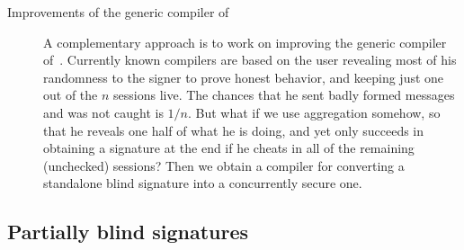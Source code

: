 \begin{description}
\item[Improvements of the generic compiler of~\cite{}]  A complementary approach is to work on improving the generic compiler of~\cite{}.  
Currently known compilers are based on the user revealing most of his randomness to the signer to prove honest behavior, and keeping just one out of the $n$ sessions live.  The chances that he sent badly formed messages and was not caught is $1/n$.  But what if we use aggregation somehow, so that he reveals one half of what he is doing, and yet only succeeds in obtaining a signature at the end if he cheats in all of the remaining (unchecked) sessions? Then we obtain a compiler for converting a standalone blind signature into a concurrently secure one.  
\end{description}


\subsection{Partially blind signatures}
\label{rg1:partially}


